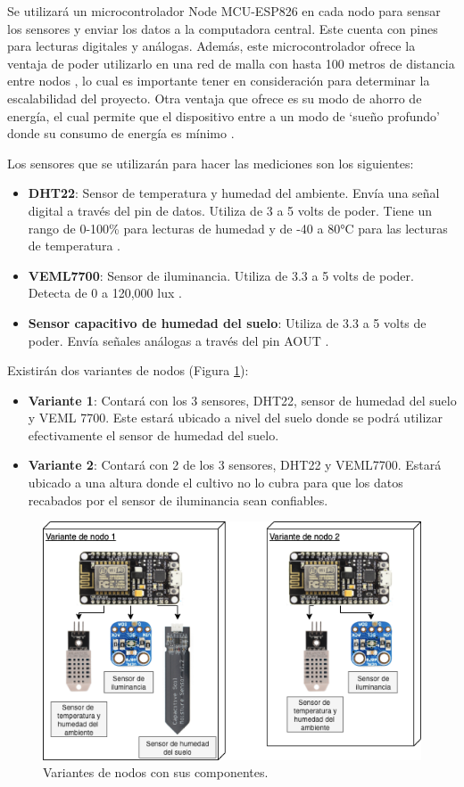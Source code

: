 Se utilizará un microcontrolador Node MCU-ESP826 en cada nodo para sensar los sensores y enviar los datos a la computadora central. Este cuenta con pines para lecturas digitales y análogas. Además, este microcontrolador ofrece la ventaja de poder utilizarlo en una red de malla con hasta 100 metros de distancia entre nodos \cite{nodemcu_mesh}, lo cual es importante tener en consideración para determinar la escalabilidad del proyecto. Otra ventaja que ofrece es su modo de ahorro de energía, el cual permite que el dispositivo entre a un modo de `sueño profundo' donde su consumo de energía es mínimo \cite{nodemcu_datasheet}. 

Los sensores que se utilizarán para hacer las mediciones son los siguientes:
\begin{itemize}
    \item \textbf{DHT22}: Sensor de temperatura y humedad del ambiente. Envía una señal digital a través del pin de datos. Utiliza de 3 a 5 volts de poder. Tiene un rango de 0-100\% para lecturas de humedad y de -40 a 80°C para las lecturas de temperatura \cite{dht22_product_page}.
    \item \textbf{VEML7700}: Sensor de iluminancia. Utiliza de 3.3 a 5 volts de poder. Detecta de 0 a 120,000 lux \cite{veml_product_page}. 
    \item \textbf{Sensor capacitivo de humedad del suelo}: Utiliza de 3.3 a 5 volts de poder. Envía señales análogas a través del pin AOUT \cite{capacitive_soil_sensor_specs}.
\end{itemize}

Existirán dos variantes de nodos (Figura \ref{fig:componentes_nodos_wsn}):
\begin{itemize}
    \item \textbf{Variante 1}: Contará con los 3 sensores, DHT22, sensor de humedad del suelo y VEML 7700. Este estará ubicado a nivel del suelo donde se podrá utilizar efectivamente el sensor de humedad del suelo.
    \item \textbf{Variante 2}: Contará con 2 de los 3 sensores, DHT22 y VEML7700. Estará ubicado a una altura donde el cultivo no lo cubra para que los datos recabados por el sensor de iluminancia sean confiables.
\end{itemize}

\begin{figure}[!ht]
	\centering
	\includegraphics[width=.80\linewidth]{imagenes/diagramas/componentes_nodos_wsn.png}
	\caption{Variantes de nodos con sus componentes.}
	\label{fig:componentes_nodos_wsn}
\end{figure}

